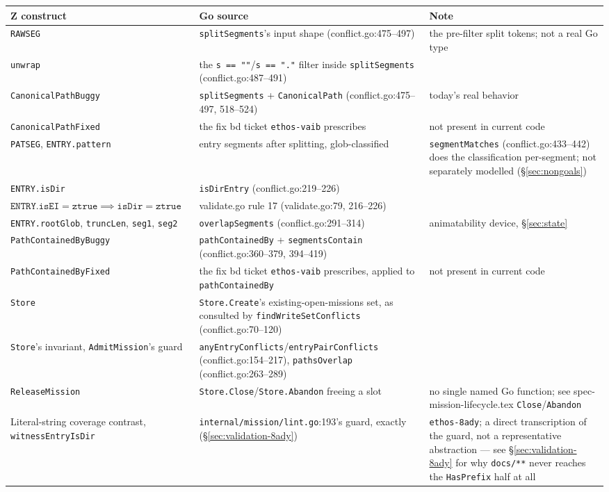 \documentclass[a4paper,10pt,fleqn]{article}
\newcommand{\fpath}[1]{\texttt{#1}}
\newcommand{\field}[1]{\texttt{#1}}
\begin{document}
\begin{center}
\begin{tabularx}{\textwidth}{@{}llX@{}}
\toprule
\textbf{Z construct} & \textbf{Go source} & \textbf{Note} \\
\midrule
\field{RAWSEG} & \field{splitSegments}'s input shape
  (conflict.go:475--497) & the pre-filter split tokens; not a real Go
  type \\
\field{unwrap} & the \field{s == ""}/\field{s == "."} filter inside
  \field{splitSegments} (conflict.go:487--491) & \\
\field{CanonicalPathBuggy} & \field{splitSegments} +
  \field{CanonicalPath} (conflict.go:475--497, 518--524) & today's
  real behavior \\
\field{CanonicalPathFixed} & the fix bd ticket \field{ethos-vaib}
  prescribes & not present in current code \\
\field{PATSEG}, \field{ENTRY.pattern} & entry segments after
  splitting, glob-classified & \field{segmentMatches}
  (conflict.go:433--442) does the classification per-segment; not
  separately modelled (\S\ref{sec:nongoals}) \\
\field{ENTRY.isDir} & \field{isDirEntry} (conflict.go:219--226) & \\
$\field{ENTRY.isEI} = \field{ztrue} \implies \field{isDir} = \field{ztrue}$ & validate.go rule
  17 (validate.go:79, 216--226) & \\
\field{ENTRY.rootGlob}, \field{truncLen}, \field{seg1}, \field{seg2} &
  \field{overlapSegments} (conflict.go:291--314) & animatability
  device, \S\ref{sec:state} \\
\field{PathContainedByBuggy} & \field{pathContainedBy} +
  \field{segmentsContain} (conflict.go:360--379, 394--419) & \\
\field{PathContainedByFixed} & the fix bd ticket \field{ethos-vaib}
  prescribes, applied to \field{pathContainedBy} & not present in
  current code \\
\field{Store} & \field{Store.Create}'s existing-open-missions set,
  as consulted by \field{findWriteSetConflicts}
  (conflict.go:70--120) & \\
\field{Store}'s invariant, \field{AdmitMission}'s guard &
  \field{anyEntryConflicts}/\field{entryPairConflicts}
  (conflict.go:154--217), \field{pathsOverlap}
  (conflict.go:263--289) & \\
\field{ReleaseMission} & \field{Store.Close}/\field{Store.Abandon}
  freeing a slot & no single named Go function; see
  spec-mission-lifecycle.tex \field{Close}/\field{Abandon} \\
Literal-string coverage contrast, \field{witnessEntryIsDir} &
  \fpath{internal/mission/lint.go}:193's guard, exactly
  (\S\ref{sec:validation-8ady}) & \field{ethos-8ady}; a direct
  transcription of the guard, not a representative abstraction --- see
  \S\ref{sec:validation-8ady} for why \texttt{docs/**} never reaches
  the \field{HasPrefix} half at all \\
\bottomrule
\end{tabularx}
\end{center}
\end{document}
